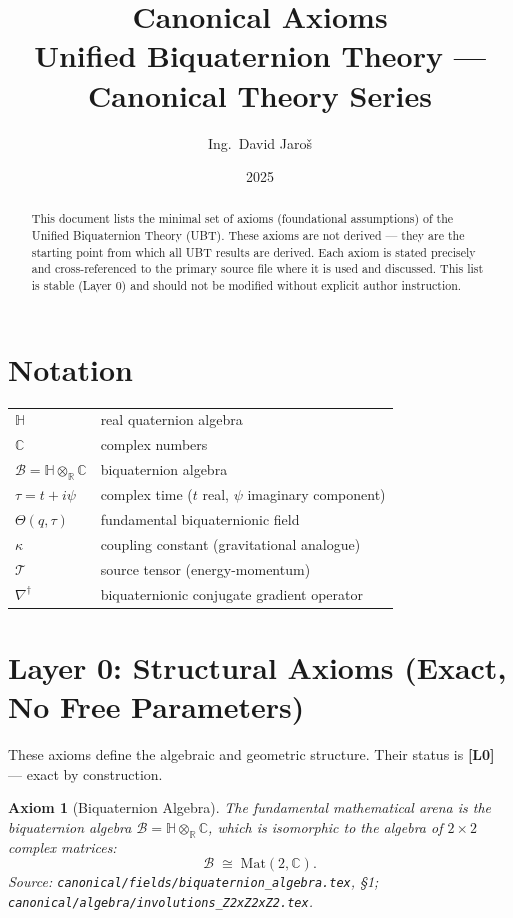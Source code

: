 \documentclass[11pt,a4paper]{article}
\title{Canonical Axioms\\
\large Unified Biquaternion Theory — Canonical Theory Series}
\author{Ing.\ David Jaroš}
\date{2025}
\newtheorem{axiom}{Axiom}
\begin{document}
\maketitle

\begin{abstract}
This document lists the minimal set of axioms (foundational assumptions) of
the Unified Biquaternion Theory (UBT). These axioms are not derived — they
are the starting point from which all UBT results are derived. Each axiom is
stated precisely and cross-referenced to the primary source file where it is
used and discussed. This list is stable (Layer 0) and should not be modified
without explicit author instruction.
\end{abstract}

\section*{Notation}

\begin{tabular}{ll}
$\mathbb{H}$ & real quaternion algebra \\
$\mathbb{C}$ & complex numbers \\
$\mathcal{B} = \mathbb{H}\otimes_\mathbb{R}\mathbb{C}$ & biquaternion algebra \\
$\tau = t + i\psi$ & complex time ($t$ real, $\psi$ imaginary component) \\
$\Theta(q,\tau)$ & fundamental biquaternionic field \\
$\kappa$ & coupling constant (gravitational analogue) \\
$\mathcal{T}$ & source tensor (energy-momentum) \\
$\nabla^\dagger$ & biquaternionic conjugate gradient operator \\
\end{tabular}

\bigskip

\section{Layer 0: Structural Axioms (Exact, No Free Parameters)}

These axioms define the algebraic and geometric structure.
Their status is \textbf{[L0]} — exact by construction.

\begin{axiom}[Biquaternion Algebra]\label{ax:algebra}
The fundamental mathematical arena is the biquaternion algebra
$\mathcal{B} = \mathbb{H}\otimes_\mathbb{R}\mathbb{C}$, which is isomorphic
to the algebra of $2\times 2$ complex matrices:
\begin{equation}
  \mathcal{B} \;\cong\; \mathrm{Mat}(2,\mathbb{C}).
\end{equation}
\emph{Source}: \texttt{canonical/fields/biquaternion\_algebra.tex}, \S1;
\texttt{canonical/algebra/involutions\_Z2xZ2xZ2.tex}.
\end{axiom}
\end{document}
